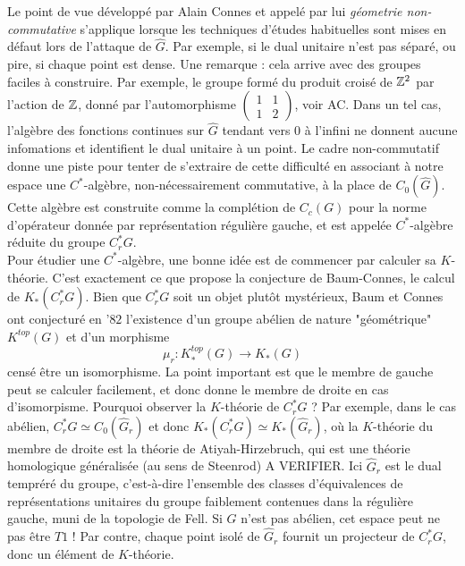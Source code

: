 Le point de vue développé par Alain Connes et appelé par lui \textit{géometrie non-commutative} s'applique lorsque les techniques d'études habituelles sont mises en défaut lors de l'attaque de $\hat G$. Par exemple, si le dual unitaire n'est pas séparé, ou pire, si chaque point est dense. Une remarque : cela arrive avec des groupes faciles à construire. Par exemple, le groupe formé du produit croisé de $\mathbb Z^2$ par l'action de $\mathbb Z$, donné par l'automorphisme $\begin{pmatrix}1 & 1 \\ 1 & 2 \end{pmatrix}$, voir AC. Dans un tel cas, l'algèbre des fonctions continues sur $\hat G$ tendant vers $0$ à l'infini ne donnent aucune infomations et identifient le dual unitaire à un point. Le cadre non-commutatif donne une piste pour tenter de s'extraire de cette difficulté en associant à notre espace une $C^*$-algèbre, non-nécessairement commutative, à la place de $C_0(\hat G)$. Cette algèbre est construite comme la complétion de $C_c(G)$ pour la norme d'opérateur donnée par représentation régulière gauche, et est appelée $C^*$-algèbre réduite du groupe $C_r^*G$.\\

Pour étudier une $C^*$-algèbre, une bonne idée est de commencer par calculer sa $K$-théorie. C'est exactement ce que propose la conjecture de Baum-Connes, le calcul de $K_*(C_r^* G)$. Bien que $C_r^* G $ soit un objet plutôt mystérieux, Baum et Connes ont conjecturé en '$82$ l'existence d'un groupe abélien de nature "géométrique" $K^{top}(G)$ et d'un morphisme 
\[\mu_r : K^{top}_*(G)\rightarrow K_*(G)\]
censé être un isomorphisme. La point important est que le membre de gauche peut se calculer facilement, et donc donne le membre de droite en cas d'isomorpisme. Pourquoi observer la $K$-théorie de $C^*_r G$ ? Par exemple, dans le cas abélien, $C_r^*G\simeq C_0(\hat G_r)$ et donc $K_*(C_r^*G)\simeq K_*(\hat G_r)$, où la $K$-théorie du membre de droite est la théorie de Atiyah-Hirzebruch, qui est une théorie homologique généralisée (au sens de Steenrod) A VERIFIER. Ici $\hat G_r$ est le dual tempréré du groupe, c'est-à-dire l'ensemble des classes d'équivalences de représentations unitaires du groupe faiblement contenues dans la régulière gauche, muni de la topologie de Fell. Si $G$ n'est pas abélien, cet espace peut ne pas être $T1$ ! Par contre, chaque point isolé de $\hat G_r$ fournit un projecteur de $C_r^* G$, donc un élément de $K$-théorie. \\

